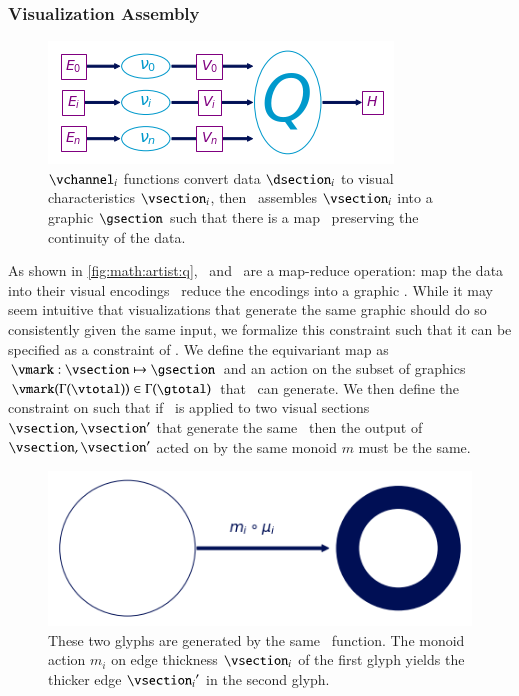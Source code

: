\documentclass[journal]{vgtc}                %
\begin{document}
\subsubsection{Visualization Assembly}
\begin{figure}[htb]
  \centering
  \includegraphics[width=\columnwidth]{path_of_q}
  \caption{$\vchannel_i$ functions convert data $\dsection_i$ to visual characteristics $\vsection_i$, then \vmark\ assembles $\vsection_i$ into a graphic $\gsection$ such that there is a map \vindex\ preserving the continuity of the data.} 
  \label{fig:math:artist:q}
\end{figure}
As shown in \autoref{fig:math:artist:q}, \vchannel\ and \vmark\ are a map-reduce operation: map the data into their visual encodings \vsection\, reduce the encodings into a graphic \gsection. While it may seem intuitive that visualizations that generate the same graphic should do so consistently given the same input, we formalize this constraint such that it can be specified as a constraint of \vmark. We define the equivariant map as  $\vmark: \vsection \mapsto \gsection$ and an action on the subset of graphics $\vmark(\Gamma(\vtotal)) \in \Gamma(\gtotal)$ that \vmark\ can generate. We then define the constraint on \vmark such that if \vmark\ is applied to two visual sections $\vsection,\vsection^{\prime}$ that generate the same \gsection\, then the output of $\vsection,\vsection^{\prime}$ acted on by the same monoid $m$ must be the same.

\begin{figure}[htb]
  \centering
  \includegraphics[width=\columnwidth]{diff_type_q.png}
  \caption{These two glyphs are generated by the same \vmark\ function. The monoid 
  action $m_i$ on edge thickness $\vsection_i$ of the first glyph yields the thicker edge ${\vsection_i}^{\prime}$ in the second glyph.}
  \label{fig:math:artist:graphic}
\end{figure}
\end{document}

